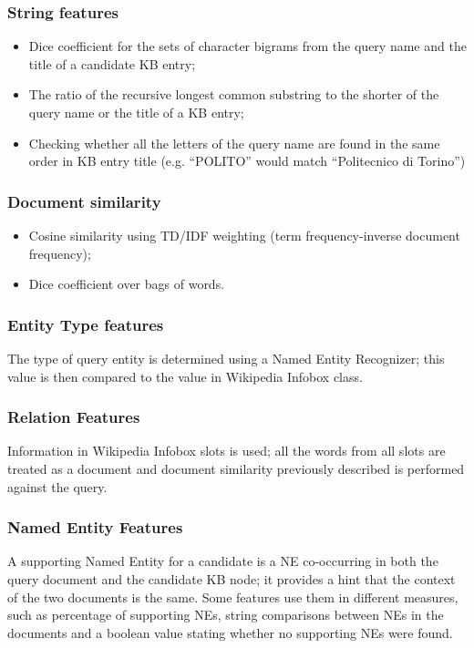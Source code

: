 \documentclass[a4paper,11pt]{report}
\begin{document}
\subsubsection{String features}
\begin{itemize}
\item Dice coefficient for the sets of character bigrams from the query name and the title of a candidate KB entry;
\item The ratio of the recursive longest common substring to the shorter of the query name or the title of a KB entry;
\item Checking whether all the letters of the query name are found in the same order in KB entry title (e.g. ``POLITO'' would match ``Politecnico di Torino'')
\end{itemize}
\subsubsection{Document similarity}
\begin{itemize}
\item Cosine similarity using TD/IDF weighting (term frequency-inverse document frequency);
\item Dice coefficient over bags of words.
\end{itemize}
\subsubsection{Entity Type features}
The type of query entity is determined using a Named Entity Recognizer; this value is then compared to the value in Wikipedia Infobox class.
\subsubsection{Relation Features}
Information in Wikipedia Infobox slots is used; all the words from all slots are treated as a document and document similarity previously described is performed against the query.
\subsubsection{Named Entity Features}
A supporting Named Entity for a candidate is a NE co-occurring in both the query document and the candidate KB node; it provides a hint that the context of the two documents is the same. Some features use them in different measures, such as percentage of supporting NEs, string comparisons between NEs in the documents and a boolean value stating whether no supporting NEs were found.
\end{document}

